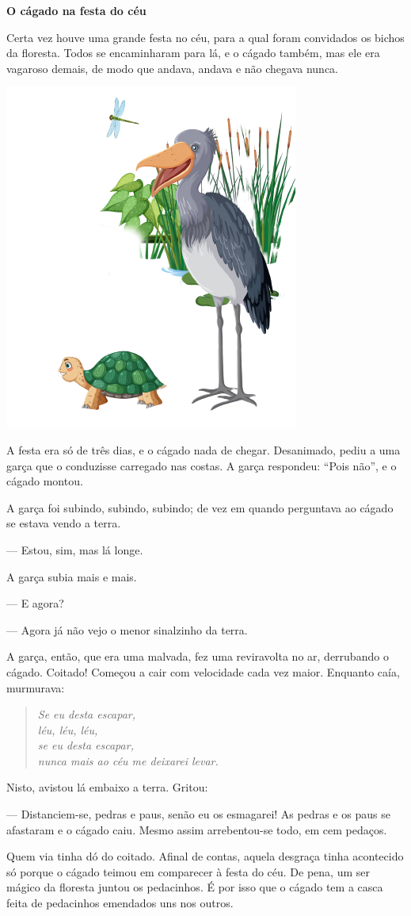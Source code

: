 \begin{myquote}
\textbf{O cágado na festa do céu}

Certa vez houve uma grande festa no céu, para a qual foram convidados os
bichos da floresta. Todos se encaminharam para lá, e o cágado também, mas
ele era vagaroso demais, de modo que andava, andava e não chegava
nunca.

\begin{center}
\includegraphics[width=.3\textwidth]{./media/image19a.png}
\end{center}

A festa era só de três dias, e o cágado nada de chegar. Desanimado, pediu
a uma garça que o conduzisse carregado nas costas. A garça respondeu: ``Pois não'', e
o cágado montou.

A garça foi subindo, subindo, subindo; de vez em quando perguntava ao
cágado se estava vendo a terra.

--- Estou, sim, mas lá longe.

A garça subia mais e mais.

--- E agora?

--- Agora já não vejo o menor sinalzinho da terra.

A garça, então, que era uma malvada, fez uma reviravolta no ar,
derrubando o cágado. Coitado! Começou a cair com velocidade cada vez
maior. Enquanto caía, murmurava:

\begin{verse}
\emph{Se eu desta escapar,}\\
\emph{léu, léu, léu,}\\
\emph{se eu desta escapar,}\\
\emph{nunca mais ao céu me deixarei levar.}\\
\end{verse}

Nisto, avistou lá embaixo a terra. Gritou:

--- Distanciem-se, pedras e paus, senão eu os esmagarei! As pedras e os paus
se afastaram e o cágado caiu. Mesmo assim arrebentou-se todo, em cem
pedaços.

Quem via tinha dó do coitado. Afinal de contas, aquela
desgraça tinha acontecido só porque o cágado teimou em comparecer à festa do
céu. De pena, um ser mágico da floresta juntou os pedacinhos.
É por isso que o cágado tem a casca feita de pedacinhos emendados uns
nos outros.

\end{myquote}

